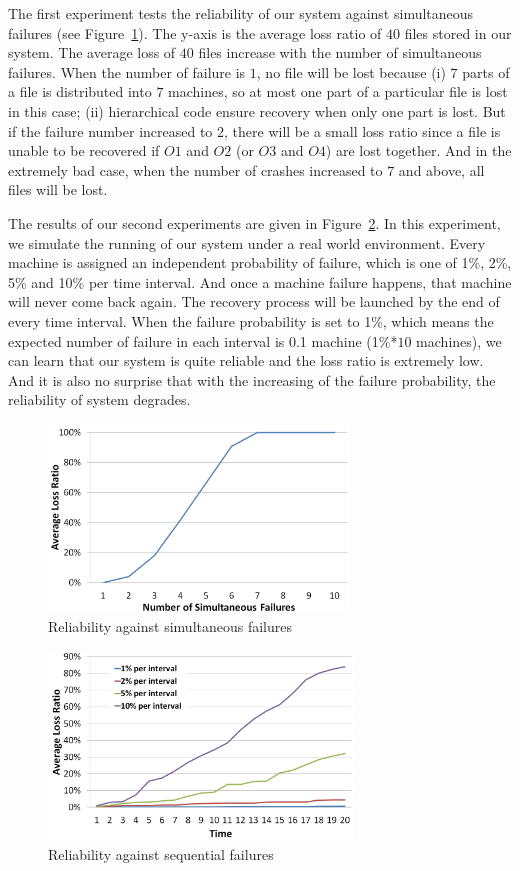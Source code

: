\documentclass[conference]{IEEEtran}
\begin{document}
The first experiment tests the reliability of our system against simultaneous failures (see Figure~\ref{fig:exp1}). The y-axis is the average loss ratio of $40$ files stored in our system. The average loss of $40$ files increase with the number of simultaneous failures. When the number of failure is $1$, no file will be lost because (i) $7$ parts of a file is distributed into $7$ machines, so at most one part of a particular file is lost in this case; (ii) hierarchical code ensure recovery when only one part is lost. But if the failure number increased to $2$, there will be a small loss ratio since a file is unable to be recovered if $O1$ and $O2$ (or $O3$ and $O4$) are lost together. And in the extremely bad case, when the number of crashes increased to $7$ and above, all files will be lost.



The results of our second experiments are given in Figure~\ref{fig:exp2}. In this experiment, we simulate the running of our system under a real world environment. Every machine is assigned an independent probability of failure, which is one of  1\%, 2\%, 5\% and 10\% per time interval. And once a machine failure happens, that machine will never come back again. The recovery process will be launched by the end of every time interval. When the failure probability is set to 1\%, which means the expected number of failure in each interval is 0.1 machine (1\%*$10$ machines), we can learn that our system is quite reliable and the loss ratio is extremely low. And it is also no surprise that with the increasing of the failure probability, the reliability of system degrades.


\begin{figure}
	\centering
		\includegraphics[height=50mm]{exp1.jpg}
		\caption{Reliability against simultaneous failures}
	\label{fig:exp1}
\end{figure}

\begin{figure}
	\centering
		\includegraphics[height=50mm]{exp2.jpg}
		\caption{Reliability against sequential failures}
	\label{fig:exp2}
\end{figure}
\end{document}

